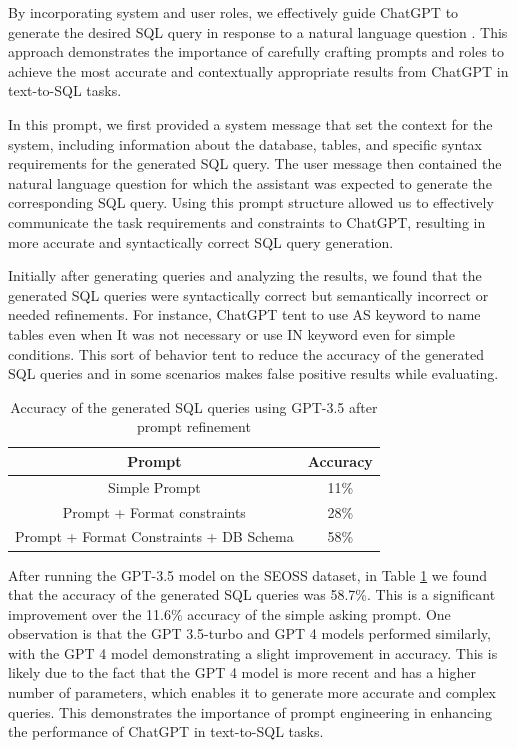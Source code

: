 By incorporating system and user roles, we effectively guide ChatGPT to generate the desired SQL query in response to a natural language question \cite{white2023prompt}. This approach demonstrates the importance of carefully crafting prompts and roles to achieve the most accurate and contextually appropriate results from ChatGPT in text-to-SQL tasks.

In this prompt, we first provided a system message that set the context for the system, including information about the database, tables, and specific syntax requirements for the generated SQL query. The user message then contained the natural language question for which the assistant was expected to generate the corresponding SQL query.
Using this prompt structure allowed us to effectively communicate the task requirements and constraints to ChatGPT, resulting in more accurate and syntactically correct SQL query generation.

Initially after generating queries and analyzing the results, we found that the generated SQL queries were syntactically correct but semantically incorrect or needed refinements. For instance, ChatGPT tent to use AS keyword to name tables even when It was not necessary or use IN keyword even for simple conditions. This sort of behavior tent to reduce the accuracy of the generated SQL queries and in some scenarios makes false positive results while evaluating.

\begin{table}[H]
    \centering
    \begin{tabular}{c|c}
        \hline
        \textbf{Prompt}                         & \textbf{Accuracy} \\ \hline
        Simple Prompt                           & 11\%              \\ \hline
        Prompt + Format constraints             & 28\%              \\ \hline
        Prompt + Format Constraints + DB Schema & 58\%              \\ \hline
    \end{tabular}
    \caption{Accuracy of the generated SQL queries using GPT-3.5 after prompt refinement}
    \label{tab:prompt-refinement}
\end{table}

After running the GPT-3.5 model on the SEOSS dataset, in Table \ref{tab:prompt-refinement} we found that the accuracy of the generated SQL queries was 58.7\%. This is a significant improvement over the 11.6\% accuracy of the simple asking prompt. One observation is that the GPT 3.5-turbo and GPT 4 models performed similarly, with the GPT 4 model demonstrating a slight improvement in accuracy. This is likely due to the fact that the GPT 4 model is more recent and has a higher number of parameters, which enables it to generate more accurate and complex queries. This demonstrates the importance of prompt engineering in enhancing the performance of ChatGPT in text-to-SQL tasks.

